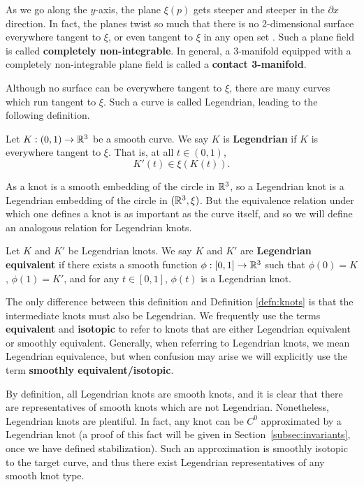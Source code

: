 As we go along the $y$-axis, the plane $\xi(p)$  gets steeper and steeper in the $\partial x$ direction. In fact, the planes twist so much that there is no 2-dimensional surface everywhere tangent to $\xi$, or even tangent to $\xi$ in any open set \cite{boothby}.
Such a plane field is called \textbf{completely non-integrable}.
In general, a 3-manifold equipped with a completely non-integrable plane field is called a \textbf{contact 3-manifold}.

Although no surface can be everywhere tangent to $\xi$, there are many curves which run tangent to $\xi$. Such a curve is called Legendrian, leading to the following definition.

\begin{definition}
    Let $K: (0, 1) \to \mathbb{R}^3$ be a smooth curve. We say $K$ is \textbf{Legendrian} if $K$ is everywhere tangent to $\xi$. That is, at all $t \in (0, 1)$,
    \[
        K'(t) \in \xi(K(t)).
    \]
\end{definition}

As a knot is a smooth embedding of the circle in $\mathbb{R}^3$, so a Legendrian knot is a Legendrian embedding of the circle in $(\mathbb{R}^3, \xi)$. But the equivalence relation under which one defines a knot is as important as the curve itself, and so we will define an analogous relation for Legendrian knots. 

\begin{definition}
    Let $K$ and $K'$ be Legendrian knots. We say $K$ and $K'$ are \textbf{Legendrian equivalent} if there exists a smooth function ${\phi: [0, 1] \to \mathbb{R}^3}$ such that
    ${\phi(0) = K}$, ${\phi(1) = K'}$, and for any ${t \in [0, 1]}$, $\phi(t)$ is a Legendrian knot.
\end{definition}

The only difference between this definition and Definition \ref{defn:knots} is that the intermediate knots must also be Legendrian.
We frequently use the terms \textbf{equivalent} and \textbf{isotopic} to refer to knots that are either Legendrian equivalent or smoothly equivalent. Generally, when referring to Legendrian knots, we mean Legendrian equivalence, but when confusion may arise we will explicitly use the term \textbf{smoothly equivalent/isotopic}.

By definition, all Legendrian knots are smooth knots, and it is clear that there are representatives of smooth knots which are not Legendrian. Nonetheless, Legendrian knots are plentiful. In fact, any knot can be $C^0$ approximated by a Legendrian knot (a proof of this fact will be given in Section~\ref{subsec:invariants}, once we have defined stabilization).
Such an approximation is smoothly isotopic to the target curve, and thus there exist Legendrian representatives of any smooth knot type.


